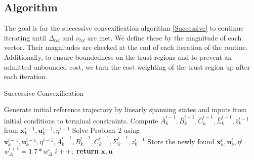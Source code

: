 \subsection{Algorithm}
The goal is for the successive convexification algorithm \ref{Successive} to continue iterating until $\Delta_{tol}$ and $\nu_{tol}$ are met. We define these by the magnitude of each vector. Their magnitudes are checked at the end of each iteration of the routine. Additionally, to ensure boundedness on the trust regions and to prevent an admitted unbounded cost, we turn the cost weighting of the trust region up after each iteration.

\begin{algorithm}
\caption{Successive Convexification}\label{Successive}
\begin{algorithmic}[1]
\State Generate initial reference trajectory by linearly spanning states and inputs from initial conditions to terminal constraints.
\State Compute $\bar{A}_k^{i-1}, \bar{B}_k^{i-1}, \bar{C}_k^{i-1}, \bar{\Sigma}_k^{i-1}, \bar{z}_k^{i-1}$ from $\mathbf{x}_k^{i-1}, \mathbf{u}_k^{i-1}, \eta^{i-1}$
\State Solve Problem 2 using $\mathbf{x}_k^{i-1}, \mathbf{u}_k^{i-1}, \eta^{i-1}, \bar{A}_k^{i-1}, \bar{B}_k^{i-1}, \bar{C}_k^{i-1}, \bar{\Sigma}_k^{i-1}, \bar{z}_k^{i-1}$
\State Store the newly found $\mathbf{x}_k^{i}, \mathbf{u}_k^{i}, \eta^{i}$
\State $w^{i+1}_\Delta = 1.7*w^{i}_\Delta$
\State $i++;$
\EndWhile 
\State \textbf{return} $\mathbf{x}, \mathbf{u}$
\EndProcedure
\end{algorithmic}
\end{algorithm}



